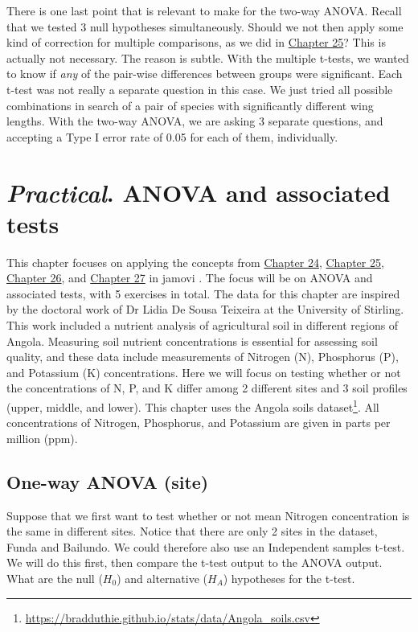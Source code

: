 \documentclass[
  openany]{krantz}
\begin{document}
There is one last point that is relevant to make for the two-way ANOVA.
Recall that we tested 3 null hypotheses simultaneously.
Should we not then apply some kind of correction for multiple comparisons, as we did in \protect\hyperlink{Chapter_25}{Chapter 25}?
This is actually not necessary.
The reason is subtle.
With the multiple t-tests, we wanted to know if \emph{any} of the pair-wise differences between groups were significant.
Each t-test was not really a separate question in this case.
We just tried all possible combinations in search of a pair of species with significantly different wing lengths.
With the two-way ANOVA, we are asking 3 separate questions, and accepting a Type I error rate of 0.05 for each of them, individually.

\hypertarget{Chapter_28}{%
\chapter{\texorpdfstring{\emph{Practical}. ANOVA and associated tests}{Practical. ANOVA and associated tests}}\label{Chapter_28}}

This chapter focuses on applying the concepts from \protect\hyperlink{Chapter_24}{Chapter 24}, \protect\hyperlink{Chapter_25}{Chapter 25}, \protect\hyperlink{Chapter_26}{Chapter 26}, and \protect\hyperlink{Chapter_27}{Chapter 27} in jamovi \citep{Jamovi2022}.
The focus will be on ANOVA and associated tests, with 5 exercises in total.
The data for this chapter are inspired by the doctoral work of Dr Lidia De Sousa Teixeira at the University of Stirling.
This work included a nutrient analysis of agricultural soil in different regions of Angola.
Measuring soil nutrient concentrations is essential for assessing soil quality, and these data include measurements of Nitrogen (N), Phosphorus (P), and Potassium (K) concentrations.
Here we will focus on testing whether or not the concentrations of N, P, and K differ among 2 different sites and 3 soil profiles (upper, middle, and lower).
This chapter uses the Angola soils dataset\footnote{\url{https://bradduthie.github.io/stats/data/Angola_soils.csv}}.
All concentrations of Nitrogen, Phosphorus, and Potassium are given in parts per million (ppm).

\hypertarget{one-way-anova-site}{%
\section{One-way ANOVA (site)}\label{one-way-anova-site}}

Suppose that we first want to test whether or not mean Nitrogen concentration is the same in different sites.
Notice that there are only 2 sites in the dataset, Funda and Bailundo.
We could therefore also use an Independent samples t-test.
We will do this first, then compare the t-test output to the ANOVA output.
What are the null (\(H_{0}\)) and alternative (\(H_{A}\)) hypotheses for the t-test.
\end{document}
